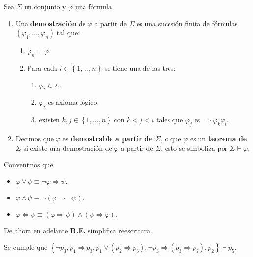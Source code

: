 \documentclass[12pt]{report}
\theoremstyle{largebreak}
\begin{document}
    \begin{mydef}
        Sea $\Sigma$ un conjunto y $\varphi$ una fórmula.
        \begin{enumerate}
            \item Una \textbf{demostración} de $\varphi$ a partir de $\Sigma$ es una sucesión finita de fórmulas $(\varphi_1,...,\varphi_n)$ tal que:
            \begin{enumerate}
                \item $\varphi_n=\varphi$.
                \item Para cada $i\in\left\{1,...,n\right\}$ se tiene una de las tres:
                \begin{enumerate}
                    \item $\varphi_i\in\Sigma$.
                    \item $\varphi_i$ es axioma lógico.
                    \item existen $k,j\in\left\{1,...,n\right\}$ con $k<j<i$ tales que $\varphi_j$ es $\Rightarrow\varphi_k\varphi_i$.
                \end{enumerate}
            \end{enumerate}
            \item Decimos que $\varphi$ es \textbf{demostrable a partir de $\Sigma$}, o que $\varphi$ es un \textbf{teorema de $\Sigma$} si existe una demostración de $\varphi$ a partir de $\Sigma$, esto se simboliza por $\Sigma\vdash\varphi$.
        \end{enumerate}
    \end{mydef}

    \begin{mydef}
        Convenimos que
        \begin{itemize}
            \item $\varphi\lor\psi\equiv\neg\varphi\Rightarrow\psi$.
            \item $\varphi\land\psi\equiv\neg(\varphi\Rightarrow\neg\psi)$.
            \item $\varphi\iff\psi\equiv(\varphi\Rightarrow\psi)\land(\psi\Rightarrow\varphi)$.
        \end{itemize}
    \end{mydef}

    \begin{obs}
        De ahora en adelante \textbf{R.E.} simplifica reescritura.
    \end{obs}

    \begin{exa}
        Se cumple que $\left\{\neg p_3,p_1\Rightarrow p_3,p_1\lor(p_2\Rightarrow p_3),\neg p_3\Rightarrow(p_3\Rightarrow p_5),p_2 \right\}\vdash p_5$.    
    \end{exa}
\end{document}
